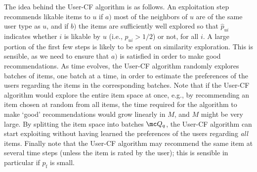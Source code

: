 \documentclass{article}
\newcommand\pf{p_{\mathrm{f}}}
\newcommand\nitem{M}
\newcommand{\setQ}{\mc Q}
\begin{document}
The idea behind the User-CF algorithm is as follows. 
An exploitation step recommends likable items to $u$ if  $a)$ most of the neighbors of $u$ are of the same user type as $u$, and if $b)$ the items are sufficiently well explored so that $\hat p_{ui}$ indicates whether $i$ is likable by $u$ (i.e., $p_{ui}>1/2$) or not, for all $i$. 
A large portion of the first few steps is likely to be spent on similarity exploration. This is sensible, as we need to ensure that $a)$ is satisfied in order to make good recommendations. 
As time evolves, the User-CF algorithm randomly explores batches  of items, one batch at a time, in order to estimate the preferences of the users regarding the items in the corresponding batches. 
Note that if the User-CF algorithm would explore the entire item space at once, e.g., by recommending an item chosen at random from all items, 
the time required for the algorithm to make `good' recommendations would grow linearly in $\nitem$, and $\nitem$ might be very large. 
By splitting the item space into batches $\setQ_q$, the User-CF algorithm can start exploiting without having learned the preferences of the users regarding \emph{all} items. 
Finally note that the User-CF algorithm may recommend the same item at several time steps (unless the item is rated by the user); this is sensible in particular if $\pf$ is small. 

%
%
\end{document}
